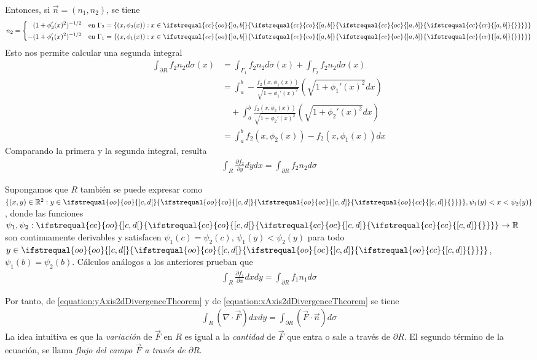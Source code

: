 \documentclass{report}
\newcommand{\realNumbers}{\mathbb{R}}
\theoremstyle{definition}
\theoremstyle{remark}
\newcommand{\leftOpenInterval}{\left]}
\newcommand{\rightOpenInterval}{\right[}
\newcommand{\leftClosedInterval}{\left[}
\newcommand{\rightClosedInterval}{\right]}
\newcommand{\interval}[3]{%
  \ifstrequal{#1}{oo}{%
    \leftOpenInterval #2, #3 \rightOpenInterval%
  }{%
    \ifstrequal{#1}{co}{%
      \leftClosedInterval #2, #3 \rightOpenInterval%
    }{%
      \ifstrequal{#1}{oc}{
        \leftOpenInterval #2, #3 \rightClosedInterval%
      }{%
        \ifstrequal{#1}{cc}{
          \leftClosedInterval #2, #3 \rightClosedInterval
        }{%
        }%
      }%
    }%
  }%
}
\begin{document}
  Entonces, si \(\vec{n} = (n_1, n_2)\), se tiene 
  \begin{align}
    n_2
    =
    \left\{
      \begin{aligned}
        (1 + \phi_2'(x)^2)^{- 1 / 2}
        && \text{en }
        \Gamma_2 = \{(x, \phi_2(x)) : x \in \interval{cc}{a}{b}\}
        \\
        - (1 + \phi_1'(x)^2)^{- 1 / 2}
        && \text{en }
        \Gamma_1 = \{(x, \phi_1(x)) : x \in \interval{cc}{a}{b}\}
      \end{aligned}
    \right.
  \end{align}
  Esto nos permite calcular una segunda integral
  \begin{align}
    \int_{\partial R} f_2 n_2 d \sigma(x)
    &=
    \int_{\Gamma_1} f_2 n_2 d \sigma(x)
    + \int_{\Gamma_2} f_2 n_2 d \sigma(x)
    \\
    &=
    \int_a^b
      - \frac{f_2(x, \phi_1(x))}{\sqrt{1 + \phi_1'(x)^2}}
    \left( \sqrt{1 + \phi_1'(x)^2} d x \right)
    \\
    &\quad
      + \int_a^b
        \frac{f_2(x, \phi_2(x))}{\sqrt{1 + \phi_2'(x)^2}}
      \left( \sqrt{1 + \phi_2'(x)^2} d x \right)
    \\
    &=
    \int_a^b f_2(x, \phi_2(x)) - f_2(x, \phi_1(x)) dx
  \end{align}
  Comparando la primera y la segunda integral, resulta
  \begin{align}
    \label{equation:yAxis2dDivergenceTheorem}
    \int_R \frac{\partial f_2}{\partial y} dy dx
    =
    \int_{\partial R} f_2 n_2 d \sigma
  \end{align}

  Supongamos que \(R\) también se puede expresar como \(\{(x, y) \in \realNumbers^2 : y \in \interval{oo}{c}{d}, \psi_1(y) < x < \psi_2(y)\}\), donde las funciones \(\psi_1, \psi_2 : \interval{cc}{c}{d} \rightarrow \realNumbers\) son continuamente derivables y satisfacen \(\psi_1(c) = \psi_2(c)\), \(\psi_1(y) < \psi_2(y)\) para todo \(y \in \interval{oo}{c}{d}\), \(\psi_1(b) = \psi_2(b)\).
  Cálculos análogos a los anteriores prueban que
  \begin{align}
    \label{equation:xAxis2dDivergenceTheorem}
    \int_R \frac{\partial f_1}{\partial x} dx dy
    =
    \int_{\partial R} f_1 n_1 d \sigma
  \end{align}

  Por tanto, de \eqref{equation:yAxis2dDivergenceTheorem} y de \eqref{equation:xAxis2dDivergenceTheorem} se tiene
  \begin{align}
    \label{equation:GaussDivergenceTheorem}
    \int_R (\nabla \cdot \vec{F}) dx dy
    =
    \int_{\partial R} (\vec{F} \cdot \vec{n}) d \sigma
  \end{align}
  La idea intuitiva es que la \emph{variación} de \(\vec{F}\) en \(R\) es igual a la \emph{cantidad} de \(\vec{F}\) que entra o sale a través de \(\partial R\).
  El segundo término de la ecuación, se llama \emph{flujo del campo \(\vec{F}\) a través de \(\partial R\)}.
\end{document}
